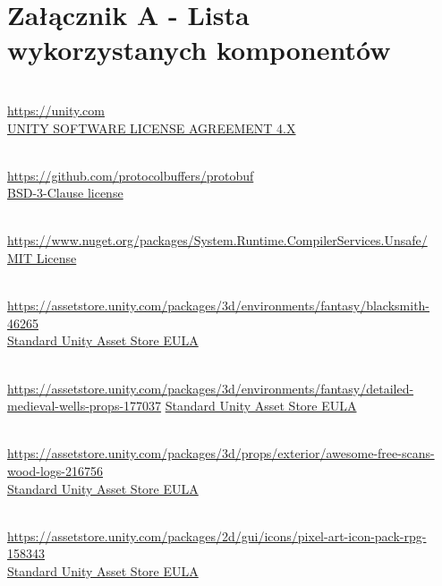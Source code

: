 \chapter*{Załącznik A - Lista wykorzystanych komponentów}
\begin{description}[]

\item[Unity] \hfill \\ \url{https://unity.com} \\
  \href{https://unity.com/legal/eula}{UNITY SOFTWARE LICENSE AGREEMENT 4.X}

\item[Protocol Buffers] \hfill \\ \url{https://github.com/protocolbuffers/protobuf} \\
  \href{https://licenses.nuget.org/BSD-3-Clause}{BSD-3-Clause license}

\item[System.Runtime.CompilerServices.Unsafe] \hfill \\ \url{https://www.nuget.org/packages/System.Runtime.CompilerServices.Unsafe/} \\
  \href{https://licenses.nuget.org/MIT}{MIT License}

\item[Blacksmith] \hfill \\ \url{https://assetstore.unity.com/packages/3d/environments/fantasy/blacksmith-46265} \\
  \href{https://unity.com/legal/as-terms}{Standard Unity Asset Store EULA}

\item[DETAILED - Medieval Wells \& Props] \hfill \\ \url{https://assetstore.unity.com/packages/3d/environments/fantasy/detailed-medieval-wells-props-177037}
  \href{https://unity.com/legal/as-terms}{Standard Unity Asset Store EULA}

\item[Awesome Free Scans - Wood Logs] \hfill \\ \url{https://assetstore.unity.com/packages/3d/props/exterior/awesome-free-scans-wood-logs-216756} \\
  \href{https://unity.com/legal/as-terms}{Standard Unity Asset Store EULA}

\item[Pixel Art Icon Pack - RPG] \hfill \\ \url{https://assetstore.unity.com/packages/2d/gui/icons/pixel-art-icon-pack-rpg-158343} \\
  \href{https://unity.com/legal/as-terms}{Standard Unity Asset Store EULA}


\end{description}
